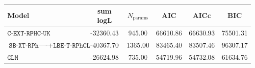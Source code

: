 \begin{tabular}{lccccc}
\toprule
Model & sum logL & $N_{\text{params}}$ & AIC & AICc & BIC \\
\midrule
$\texttt{C-EXT-RPHC-UK}$ & -32360.43 & 945.00 & 66610.86 & 66630.93 & 75501.31 \\
$\texttt{SB-XT-RPh----}+\texttt{LBE-T-RPhCL--}$ & -40367.70 & 1365.00 & 83465.40 & 83507.46 & 96307.17 \\
$\texttt{GLM}$ & -26624.98 & 735.00 & 54719.96 & 54732.08 & 61634.76 \\
\bottomrule
\end{tabular}
